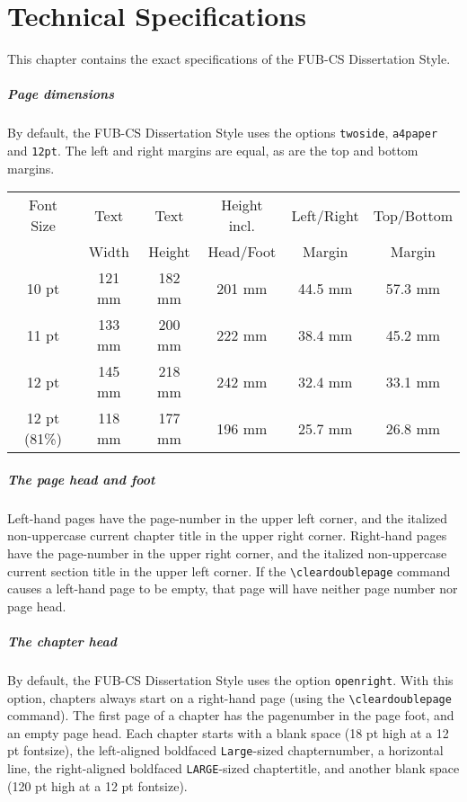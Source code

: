 \chapter{Technical Specifications}
This chapter contains the exact specifications of the FUB-CS Dissertation Style.

\paragraph*{Page dimensions}
By default, the FUB-CS Dissertation Style uses the options
\verb|twoside|, \verb|a4paper| and \verb|12pt|.
The left and right margins are equal, as are the top and bottom margins.
\\[\baselineskip]
\begin{tabular}{|c|c|c|c|c|c|}\hline
Font Size &  Text   &  Text   & Height incl.& Left/Right & Top/Bottom \\
          &  Width  &  Height &  Head/Foot  &   Margin   & Margin     \\ \hline
 10 pt    &  121 mm &  182 mm &  201 mm     &  44.5 mm   &  57.3 mm   \\
 11 pt    &  133 mm &  200 mm &  222 mm     &  38.4 mm   &  45.2 mm   \\
 12 pt    &  145 mm &  218 mm &  242 mm     &  32.4 mm   &  33.1 mm   \\
12 pt (81\%)& 118 mm & 177 mm &  196 mm     &  25.7 mm   &  26.8 mm   \\ \hline
\end{tabular}

\paragraph*{The page head and foot}
Left-hand pages have the page-number in the upper left corner,
and the italized non-uppercase current chapter title in the upper right corner.
Right-hand pages have the page-number in the upper right corner,
and the italized non-uppercase current section title in the upper left corner.
If the \verb|\cleardoublepage| command causes a left-hand page to be empty,
that page will have neither page number nor page head.

\paragraph*{The chapter head}
By default, the FUB-CS Dissertation Style uses the option \verb|openright|.
With this option, chapters always start on a right-hand page
(using the \verb|\cleardoublepage| command).
The first page of a chapter has the pagenumber in the page foot,
and an empty page head.
Each chapter starts with
a blank space (18 pt high at a 12 pt fontsize),
the left-aligned boldfaced \verb|Large|-sized chapternumber,
a horizontal line,
the right-aligned boldfaced \verb|LARGE|-sized chaptertitle,
and another blank space (120 pt high at a 12 pt fontsize).

